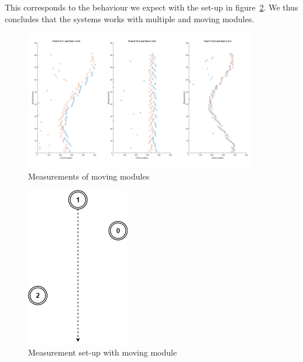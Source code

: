 This corresponds to the behaviour we expect with the set-up in figure~\ref{fig:int_meas_moving}.
We thus concludes that the systems works with multiple and moving modules.

\begin{figure}[H]
\centering
\includegraphics[width=0.9\textwidth]{Figures/meas_skate.png}
\caption{Measurements of moving modules}
\label{fig:int_meas_3}
\end{figure}

\begin{figure}[H]
\centering
\includegraphics[width=0.4\textwidth]{Figures/moving_module.png}
\caption{Measurement set-up with moving module}
\label{fig:int_meas_moving}
\end{figure}
